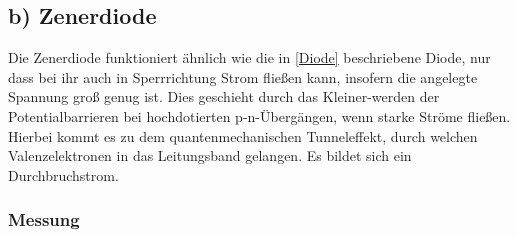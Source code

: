 \documentclass[11pt,a4paper,titlepage, ngerman]{article}
\begin{document}
		\subsection{b) Zenerdiode} 
			
			Die Zenerdiode funktioniert ähnlich wie die in \ref{Diode} beschriebene Diode, nur dass bei ihr auch in Sperrrichtung Strom fließen kann, insofern die angelegte Spannung groß genug ist.
			Dies geschieht durch das Kleiner-werden der Potentialbarrieren bei hochdotierten p-n-Übergängen, wenn starke Ströme fließen.
			Hierbei kommt es zu dem quantenmechanischen Tunneleffekt, durch welchen Valenzelektronen in das Leitungsband gelangen.
			Es bildet sich ein Durchbruchstrom.
			
			\subsubsection*{Messung}
			
\end{document}
